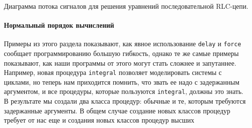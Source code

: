 \begin{cntrfig}

\caption{Диаграмма потока сигналов для решения
уравнений последовательной RLC-цепи.}
\label{P3.37}
\end{cntrfig}

\paragraph{Нормальный порядок вычислений}

Примеры из этого раздела показывают, как явное
использование {\tt delay} и {\tt force} сообщает
программированию большую гибкость, однако те же самые примеры
показывают, как наши программы от этого могут стать сложнее и
запутаннее.  Например, новая процедура {\tt integral} позволяет
моделировать системы с циклами, но теперь нам приходится помнить, что
звать ее надо с задержанным аргументом, и все процедуры, которые
пользуются {\tt integral}, должны это знать.  В результате мы
создали два клас\-са процедур: обычные и те, которым требуются
задержанные аргументы.  В общем случае создание новых классов
процедур требует от нас еще и создания новых классов процедур высших
